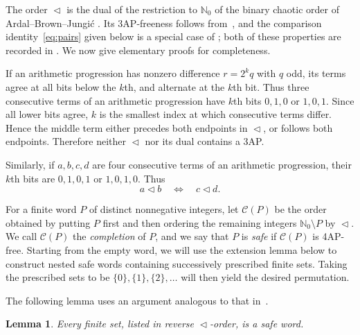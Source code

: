 \documentclass[12pt,reqno]{amsart}
\newtheorem{lemma}{Lemma}
\newcommand{\NN}{\mathbb N}
\newcommand{\bits}{\mathrel{\triangleleft}}
\newcommand{\C}[1]{\mathcal C(#1)}
\begin{document}
The order $\bits$ is the dual of the restriction to $\NN_0$ of the binary
chaotic order of Ardal--Brown--Jungi\'c \cite[Definition~2.2 and \S5,
Remark~2]{ABJ}. Its 3AP-freeness follows from~\cite[Theorem~2.2]{ABJ}, and the
comparison identity~\eqref{eq:pairs} given below is a special case of
\cite[Lemma~2.5]{HS}; both of these properties are recorded in
\cite[Lemma~2.2]{Geneson}. We now give elementary proofs for completeness.

If an arithmetic progression has nonzero difference $r=2^kq$ with $q$ odd, its
terms agree at all bits below the $k$th, and alternate at the $k$th bit. Thus
three consecutive terms of an arithmetic progression have $k$th bits $0,1,0$ or
$1,0,1$. Since all lower bits agree, $k$ is the smallest index at which
consecutive terms differ. Hence the middle term either precedes both endpoints
in $\bits$, or follows both endpoints. Therefore neither $\bits$ nor its dual
contains a 3AP.

Similarly, if $a,b,c,d$ are four consecutive terms of an arithmetic progression,
their $k$th bits are $0,1,0,1$ or $1,0,1,0$. Thus
\begin{equation}\label{eq:pairs}
 a\bits b\quad\Longleftrightarrow\quad c\bits d.
\end{equation}

For a finite word $P$ of distinct nonnegative integers, let $\C P$ be the order
obtained by putting $P$ first and then ordering the remaining integers
$\NN_0\setminus P$ by $\bits$. We call $\C P$ the \emph{completion} of $P$, and we say that $P$ is \emph{safe} if $\C P$ is 4AP-free.
Starting from the empty word, we will use the extension lemma below to construct
nested safe words containing successively prescribed finite sets. Taking the
prescribed sets to be $\{0\},\{1\},\{2\},\ldots$ will then yield the desired
permutation.

The following lemma uses an argument analogous to that in~\cite[proof of
Lemma~5.6]{Geneson}.

\begin{lemma}\label{lem:base}
Every finite set, listed in reverse $\bits$-order, is a safe word.
\end{lemma}
\end{document}
